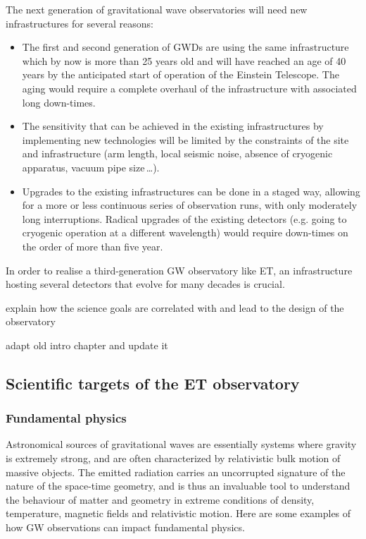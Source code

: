 The next generation of gravitational wave observatories will need new infrastructures for several reasons:
\begin{itemize}
    \item The first and second generation of GWDs are using the same infrastructure which by now is more than 25 years old and will have reached an age of 40 years by the anticipated start of operation of the Einstein Telescope. The aging would require a complete overhaul of the infrastructure with associated long down-times.
    \item The sensitivity that can be achieved in the existing infrastructures by implementing new technologies will be limited by the constraints of the site and infrastructure (arm length, local seismic noise, absence of cryogenic apparatus, vacuum pipe size\,\ldots).
    \item Upgrades to the existing infrastructures can be done in a staged way, allowing for a more or less continuous series of observation runs, with only moderately long interruptions. Radical upgrades of the existing detectors (e.g. going to cryogenic operation at a different wavelength) would require down-times on the order of more than five year. 
\end{itemize} 
In order to realise a third-generation GW observatory like ET, an infrastructure hosting several detectors that evolve for many decades is crucial.

explain how the science goals are correlated with and lead to the design of the observatory

adapt old intro chapter and update it


\clearpage

\subsection{Scientific targets of the ET observatory}
\subsubsection{Fundamental physics}
\label{ScienceCase:FundamentalPhysics}
Astronomical sources of gravitational waves are essentially
systems where gravity is extremely strong, and are often
characterized by relativistic bulk motion of massive objects.
The emitted radiation carries an uncorrupted signature of the
nature of the space-time geometry, and is thus an invaluable
tool to understand the behaviour of matter and geometry in
extreme conditions of density, temperature, magnetic fields
and relativistic motion. Here are some examples of how GW
observations can impact fundamental physics.

